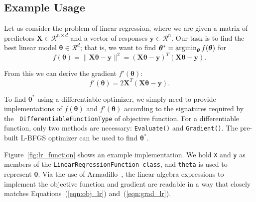 \subsection{Example Usage}
\label{sec:linreg_example}

Let us consider the problem of linear regression, where we are
given a matrix of predictors $\bm X \in \mathcal{R}^{n \times d}$ and a vector
of responses $\bm y \in \mathcal{R}^n$.  Our task is to find the best linear
model $\bm \theta \in \mathcal{R}^d$; that is, we want to find
$\bm \theta^* = \operatornamewithlimits{argmin}_{\bm\theta} f(\bm \theta)$ for
%
\begin{equation}
f(\bm \theta) = \| \bm X \bm \theta - \bm y \|^2 = (\bm X \bm \theta - \bm y)^T
(\bm X \bm \theta - \bm y).
\label{eqn:obj_lr}
\end{equation}

\noindent
From this we can derive the gradient $f'(\bm \theta)$:
%
\begin{equation}
f'(\bm \theta) = 2 \bm X^T (\bm X \bm \theta - \bm y).
\label{eqn:grad_lr}
\end{equation}

To find $\bm \theta^*$ using a differentiable
optimizer, we simply need to provide implementations of $f(\bm \theta)$ and
$f'(\bm \theta)$ according to the signatures required by the {\tt
DifferentiableFunctionType} of objective function.  For a differentiable
function, only two methods are necessary: {\tt Evaluate()} and {\tt Gradient()}.
The pre-built L-BFGS optimizer can be used to find $\bm \theta^*$.

Figure~\ref{fig:lr_function} shows an example implementation.
We hold {\tt X} and {\tt y} as members of the
{\tt LinearRegressionFunction class},
and {\tt theta} is used to represent $\bm \theta$.
Via the use of Armadillo~\cite{sanderson2016armadillo},
the linear algebra expressions to implement the objective function and gradient
are readable in a way that closely matches Equations~(\ref{eqn:obj_lr}) and~(\ref{eqn:grad_lr}).






